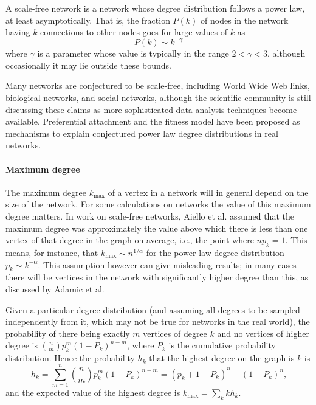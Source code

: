         A scale-free network is a network whose degree distribution follows a power law, at least asymptotically. That is, the fraction $P(k)$ of nodes in the network having $k$ connections to other nodes goes for large values of $k$ as
    $$P(k) \sim k^{-\gamma}$$
    where $\gamma$ is a parameter whose value is typically in the range $2 < \gamma < 3$, although occasionally it may lie outside these bounds.\cite{OnnelaSaramakiBarabasi2007,ChoromanskiMatuszakMiekisz2013}

        Many networks are conjectured to be scale-free, including World Wide Web links, biological networks, and social networks, although the scientific community is still discussing these claims as more sophisticated data analysis techniques become available.\cite{ClausetShaliziNewman2007} Preferential attachment and the fitness model have been proposed as mechanisms to explain conjectured power law degree distributions in real networks.
        
      \paragraph{Maximum degree}
      
        The maximum degree $k_{\mbox{max}}$ of a vertex in a network will in general depend on the size of the network. For some calculations on networks the value of this maximum degree matters. In work on scale-free networks, Aiello et al. \cite{AielloChungLu2000} assumed that the maximum degree was approximately the value above which there is less than one vertex of that degree in the graph on average, i.e., the point where $np_k = 1$. This means, for instance, that $k_{\mbox{max}} \sim n^{1/\alpha}$ for the power-law degree distribution $p_k \sim k^{−\alpha}$. This assumption however can give misleading results; in many cases there will be vertices in the network with significantly higher degree than this, as discussed by Adamic et al.\cite{AdamicLukosePuniyaniHuberman2001}
        
        Given a particular degree distribution (and assuming all degrees to be sampled independently from it, which may not be true for networks in the real world), the probability of there being exactly $m$ vertices of degree $k$ and no vertices of higher degree is $\binom{n}{m} p^m_k (1 − P_k)^{n−m}$, where $P_k$ is the cumulative probability distribution. Hence the probability $h_k$ that the highest degree on the graph is $k$ is
        $$h_k = \sum_{m=1}^n \binom{n}{m} p^m_k (1 - P_k)^{n-m} = (p_k + 1 - P_k)^n - (1 - P_k)^n\mbox{,}$$
        and the expected value of the highest degree is $k_{\mbox{max}} = \sum_k kh_k$.
        
